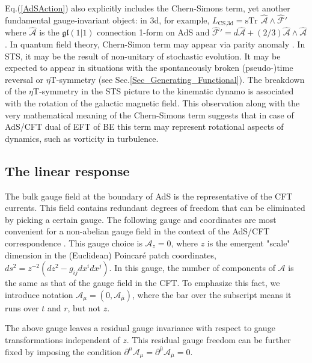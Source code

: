 \documentclass[final,5p,10pt,times,twocolumn,year]{elsarticle}
\begin{document}
Eq.(\ref{AdSAction}) also explicitly includes the Chern-Simons term, yet another fundamental gauge-invariant object: in 3d, for example, ${L}_\text{CS,3d} = \text{sTr } \hat {\mathcal A} \wedge  \hat {\mathcal F}'$ where $\hat{\mathcal A}$ is the $\mathfrak{gl}(1|1)$ connection 1-form on AdS and $\hat {\mathcal F}'=d \hat{\mathcal A} + (2/3)\hat{\mathcal A} \wedge \hat{\mathcal A}$. In quantum field theory, Chern-Simon term may appear via parity anomaly \cite{Eduardo}. In STS, it may be the result of non-unitary of stochastic evolution. It may be expected to appear in situations with the spontaneously broken (pseudo-)time reversal or $\eta$T-symmetry (see Sec.\ref{Sec_Generating_Functional}). The breakdown of the $\eta$T-symmetry in the STS picture to the kinematic dynamo \cite{Torsten} is associated with the rotation of the galactic magnetic field. This observation along with the very mathematical meaning of the Chern-Simons term suggests that in case of AdS/CFT dual of EFT of BE this term may represent rotational aspects of dynamics, such as vorticity in turbulence. 

\subsection{The linear response}

The bulk gauge field at the boundary of AdS is the representative of the CFT currents. This field contains redundant degrees of freedom that can be eliminated by picking a certain gauge. The following gauge and coordinates are most convenient for a non-abelian gauge field in the context of the AdS/CFT correspondence \cite{Sundrum_AdSCFT_2012, KaplanAdSCFT}. This gauge choice is $\mathcal A_z=0$, where $z$ is the emergent "scale" dimension in the (Euclidean) Poincaré patch coordinates, $ds^2 = z^{-2}(dz^2 - g_{ij}dx^i dx^j )$. In this gauge, the number of components of $\mathcal A$ is the same as that of the gauge field in the CFT. To emphasize this fact, we introduce notation $\mathcal{A}_\mu = (0, \mathcal{A}_{\bar\mu})$, where the bar over the subscript means it runs over $t$ and $r$, but not $z$.

The above gauge leaves a residual gauge invariance with respect to gauge transformations independent of $z$. This residual gauge freedom can be further fixed by imposing the condition $\partial^{\mu} \mathcal{A}_{\mu} = \partial^{\bar \mu} \mathcal{A}_{\bar \mu} = 0$.
\end{document}

